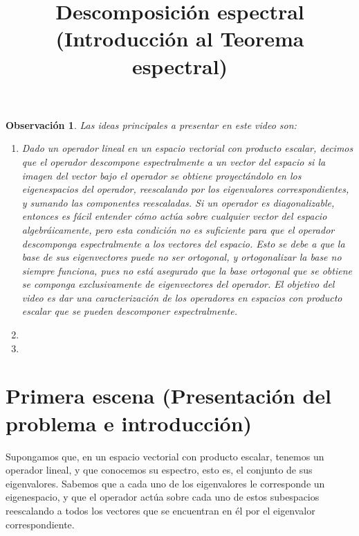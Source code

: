 \documentclass[12pt,dvipsnames]{article}
\newtheorem{obs}{Observación}[section]
\numberwithin{equation}{section}
\begin{document}
\title{Descomposición espectral \\ (Introducción al Teorema espectral)}
\date{}
\maketitle

\begin{obs}
    Las ideas principales a presentar en este video son:

    \begin{enumerate}[label=(\roman*)]
        \item Dado un operador lineal en un espacio vectorial con producto escalar, decimos que el operador descompone espectralmente a un vector del espacio si la imagen del vector bajo el operador se obtiene proyectándolo en los eigenespacios del operador, reescalando por los eigenvalores correspondientes, y sumando las componentes reescaladas. Si un operador es diagonalizable, entonces es fácil entender cómo actúa sobre cualquier vector del espacio algebráicamente, pero esta condición no es suficiente para que el operador descomponga espectralmente a los vectores del espacio. Esto se debe a que la base de sus eigenvectores puede no ser ortogonal, y ortogonalizar la base no siempre funciona, pues no está asegurado que la base ortogonal que se obtiene se componga exclusivamente de eigenvectores del operador. El objetivo del video es dar una caracterización de los operadores en espacios con producto escalar que se pueden descomponer espectralmente.

        \item 

        \item 
    \end{enumerate}
\end{obs}


\newpage
\section{Primera escena (Presentación del problema e introducción)}

Supongamos que, en un espacio vectorial con producto escalar, tenemos un operador lineal, y que conocemos su espectro, esto es, el conjunto de sus eigenvalores. Sabemos que a cada uno de los eigenvalores le corresponde un eigenespacio, y que el operador actúa sobre cada uno de estos subespacios reescalando a todos los vectores que se encuentran en él por el eigenvalor correspondiente.
\end{document}
